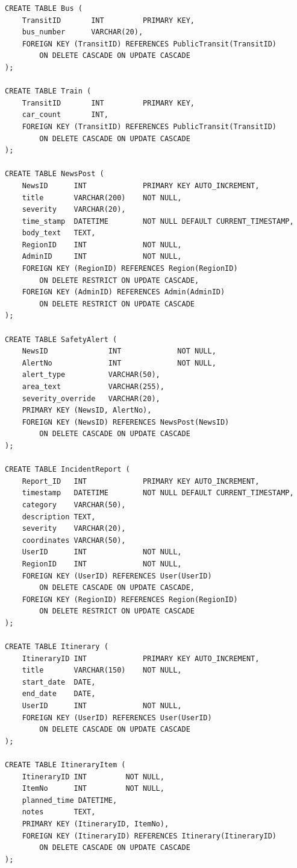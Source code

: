 \begin{lstlisting}[language=MySQL,caption={Full database schema (DDL).},label={lst:ddl}]
CREATE TABLE Bus (
    TransitID       INT         PRIMARY KEY,
    bus_number      VARCHAR(20),
    FOREIGN KEY (TransitID) REFERENCES PublicTransit(TransitID)
        ON DELETE CASCADE ON UPDATE CASCADE
);

CREATE TABLE Train (
    TransitID       INT         PRIMARY KEY,
    car_count       INT,
    FOREIGN KEY (TransitID) REFERENCES PublicTransit(TransitID)
        ON DELETE CASCADE ON UPDATE CASCADE
);

CREATE TABLE NewsPost (
    NewsID      INT             PRIMARY KEY AUTO_INCREMENT,
    title       VARCHAR(200)    NOT NULL,
    severity    VARCHAR(20),
    time_stamp  DATETIME        NOT NULL DEFAULT CURRENT_TIMESTAMP,
    body_text   TEXT,
    RegionID    INT             NOT NULL,
    AdminID     INT             NOT NULL,
    FOREIGN KEY (RegionID) REFERENCES Region(RegionID)
        ON DELETE RESTRICT ON UPDATE CASCADE,
    FOREIGN KEY (AdminID) REFERENCES Admin(AdminID)
        ON DELETE RESTRICT ON UPDATE CASCADE
);

CREATE TABLE SafetyAlert (
    NewsID              INT             NOT NULL,
    AlertNo             INT             NOT NULL,
    alert_type          VARCHAR(50),
    area_text           VARCHAR(255),
    severity_override   VARCHAR(20),
    PRIMARY KEY (NewsID, AlertNo),
    FOREIGN KEY (NewsID) REFERENCES NewsPost(NewsID)
        ON DELETE CASCADE ON UPDATE CASCADE
);

CREATE TABLE IncidentReport (
    Report_ID   INT             PRIMARY KEY AUTO_INCREMENT,
    timestamp   DATETIME        NOT NULL DEFAULT CURRENT_TIMESTAMP,
    category    VARCHAR(50),
    description TEXT,
    severity    VARCHAR(20),
    coordinates VARCHAR(50),
    UserID      INT             NOT NULL,
    RegionID    INT             NOT NULL,
    FOREIGN KEY (UserID) REFERENCES User(UserID)
        ON DELETE CASCADE ON UPDATE CASCADE,
    FOREIGN KEY (RegionID) REFERENCES Region(RegionID)
        ON DELETE RESTRICT ON UPDATE CASCADE
);

CREATE TABLE Itinerary (
    ItineraryID INT             PRIMARY KEY AUTO_INCREMENT,
    title       VARCHAR(150)    NOT NULL,
    start_date  DATE,
    end_date    DATE,
    UserID      INT             NOT NULL,
    FOREIGN KEY (UserID) REFERENCES User(UserID)
        ON DELETE CASCADE ON UPDATE CASCADE
);

CREATE TABLE ItineraryItem (
    ItineraryID INT         NOT NULL,
    ItemNo      INT         NOT NULL,
    planned_time DATETIME,
    notes       TEXT,
    PRIMARY KEY (ItineraryID, ItemNo),
    FOREIGN KEY (ItineraryID) REFERENCES Itinerary(ItineraryID)
        ON DELETE CASCADE ON UPDATE CASCADE
);


\end{lstlisting}
